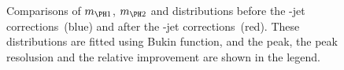\def\figpath{figures/nr-int-note/objects/V1/}

\begin{figure}[hb]
	\centering

	\caption{Comparisons of $m_{\PH1}$, $m_{\PH2}$ and \mhh distributions before the \Pqb-jet corrections~(blue) and 
                 after the \Pqb-jet corrections~(red). These distributions are fitted using Bukin function, and the peak, 
                 the peak resolusion and the relative improvement are shown in the legend.}
	\label{fig:bjetcalib-plots}
\end{figure}


